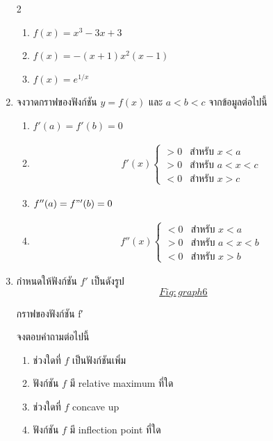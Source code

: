 \documentclass[
]{book}
\theoremstyle{definition}
\theoremstyle{definition}
\theoremstyle{definition}
\theoremstyle{definition}
\theoremstyle{remark}
\begin{document}
\begin{enumerate}
  2

  \begin{enumerate}
  \def\labelenumii{\arabic{enumii}.}
  \item
    \(f(x) = x^3-3x+3\)
  \item
    \(f(x) = -(x+1)x^2(x-1)\)
  \item
    \(f(x) = e^{1/x}\)
  \end{enumerate}
\item
  จงวาดกราฟของฟังก์ชัน \(y=f(x)\) และ \(a<b<c\) จากข้อมูลต่อไปนี้

  \begin{enumerate}
  \def\labelenumii{\arabic{enumii}.}
  \item
    \(f'(a) = f'(b) = 0\)
  \item
    \begin{equation}   \begin{aligned}
        f'(x)  \begin{cases}
        > 0 &\text{สำหรับ $x<a$} \\
        > 0 &\text{สำหรับ $a<x<c$} \\
        < 0 &\text{สำหรับ $x>c$}
        \end{cases}
      \end{aligned} \end{equation}
  \item
    \(f''(a) = f"'(b) = 0\)
  \item
    \begin{equation}   \begin{aligned}
        f''(x) \begin{cases}
        < 0 &\text{สำหรับ $x<a$} \\
        > 0 &\text{สำหรับ $a<x<b$} \\
        < 0 &\text{สำหรับ $x>b$}
        \end{cases}
      \end{aligned} \end{equation}
  \end{enumerate}
\item
  กำหนดให้ฟังก์ชัน \(f'\)
  เป็นดังรูป~\hyperref[Fig:graph6]{\[Fig:graph6\]}

  กราฟของฟังก์ชัน {f′}

  จงตอบคำถามต่อไปนี้

  \begin{enumerate}
  \def\labelenumii{\arabic{enumii}.}
  \item
    ช่วงใดที่ \(f\) เป็นฟังก์ชันเพิ่ม
  \item
    ฟังก์ชัน \(f\) มี relative maximum ที่ใด
  \item
    ช่วงใดที่ \(f\) concave up
  \item
    ฟังก์ชัน \(f\) มี inflection point ที่ใด
  \end{enumerate}
\end{enumerate}
\end{document}
